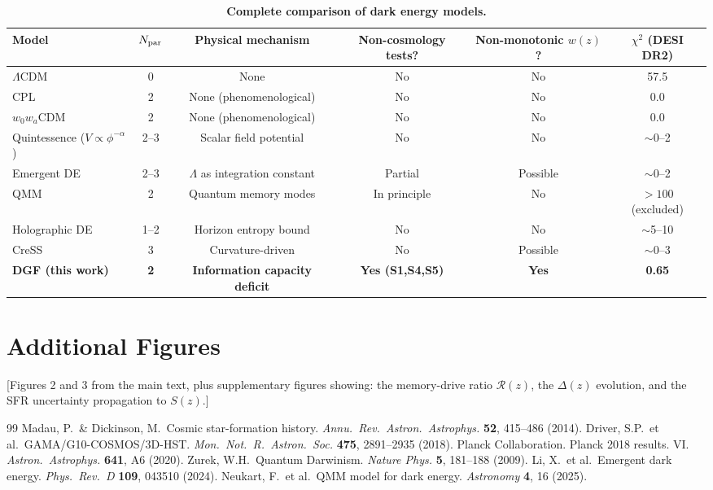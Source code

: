 \documentclass[12pt,a4paper]{article}
\begin{document}
\begin{table}[htbp]
\centering
\caption{\bf Complete comparison of dark energy models.}
\begin{tabular}{lccccc}
\toprule
Model & $N_{\rm par}$ & Physical mechanism & Non-cosmology tests? & Non-monotonic $w(z)$? & $\chi^2$ (DESI DR2) \\
\midrule
$\Lambda$CDM & 0 & None & No & No & 57.5 \\
CPL & 2 & None (phenomenological) & No & No & 0.0 \\
$w_0w_a$CDM & 2 & None (phenomenological) & No & No & 0.0 \\
Quintessence ($V\propto\phi^{-\alpha}$) & 2--3 & Scalar field potential & No & No & $\sim$0--2 \\
Emergent DE \cite{li2024} & 2--3 & $\Lambda$ as integration constant & Partial & Possible & $\sim$0--2 \\
QMM \cite{neukart2025} & 2 & Quantum memory modes & In principle & No & $>100$ (excluded) \\
Holographic DE & 1--2 & Horizon entropy bound & No & No & $\sim$5--10 \\
CreSS & 3 & Curvature-driven & No & Possible & $\sim$0--3 \\
{\bf DGF (this work)} & {\bf 2} & {\bf Information capacity deficit} & {\bf Yes (S1,S4,S5)} & {\bf Yes} & {\bf 0.65} \\
\bottomrule
\end{tabular}
\end{table}

\section{Additional Figures}

[Figures 2 and 3 from the main text, plus supplementary figures showing: the memory-drive ratio $\mathcal{R}(z)$, the $\Delta(z)$ evolution, and the SFR uncertainty propagation to $S(z)$.]

\begin{thebibliography}{99}
 Madau, P.\ \& Dickinson, M.\ Cosmic star-formation history. {\it Annu.\ Rev.\ Astron.\ Astrophys.} {\bf 52}, 415--486 (2014).
 Driver, S.P.\ et al.\ GAMA/G10-COSMOS/3D-HST. {\it Mon.\ Not.\ R.\ Astron.\ Soc.} {\bf 475}, 2891--2935 (2018).
 Planck Collaboration. Planck 2018 results. VI. {\it Astron.\ Astrophys.} {\bf 641}, A6 (2020).
 Zurek, W.H.\ Quantum Darwinism. {\it Nature Phys.} {\bf 5}, 181--188 (2009).
 Li, X.\ et al.\ Emergent dark energy. {\it Phys.\ Rev.\ D} {\bf 109}, 043510 (2024).
 Neukart, F.\ et al.\ QMM model for dark energy. {\it Astronomy} {\bf 4}, 16 (2025).
\end{thebibliography}
\end{document}
